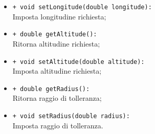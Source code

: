 \begin{flushleft}
\begin{itemize}
\begin{sloppypar}
\begin{itemize}
\item \texttt{+ void setLongitude(double longitude):}\\ Imposta longitudine richiesta;
\item \texttt{+ double getAltitude():}\\ Ritorna altitudine richiesta;
\item \texttt{+ void setAltitude(double altitude):}\\ Imposta altitudine richiesta;
\item \texttt{+ double getRadius():}\\ Ritorna raggio di tolleranza;
\item \texttt{+ void setRadius(double radius):}\\ Imposta raggio di tolleranza.
\end{itemize}
\end{sloppypar}
\end{itemize}
\end{flushleft}

